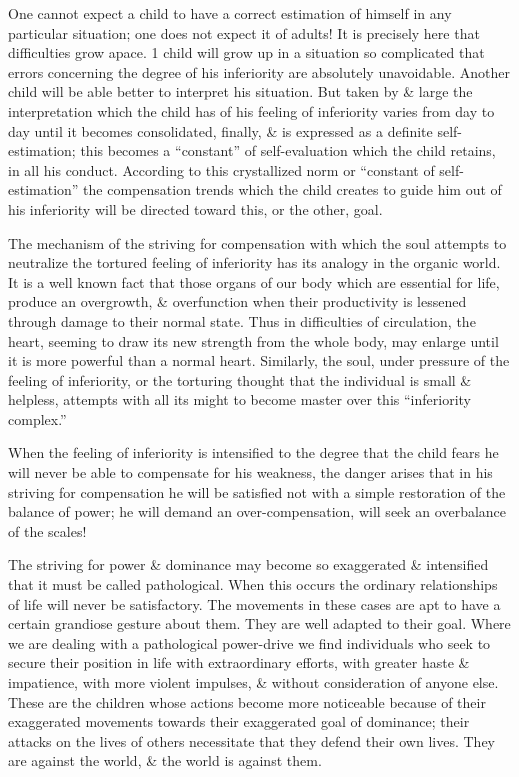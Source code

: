 \documentclass{article}
\begin{document}
One cannot expect a child to have a correct estimation of himself in any particular situation; one does not expect it of adults! It is precisely here that difficulties grow apace. 1 child will grow up in a situation so complicated that errors concerning the degree of his inferiority are absolutely unavoidable. Another child will be able better to interpret his situation. But taken by \& large the interpretation which the child has of his feeling of inferiority varies from day to day until it becomes consolidated, finally, \& is expressed as a definite self-estimation; this becomes a ``constant'' of self-evaluation which the child retains, in all his conduct. According to this crystallized norm or ``constant of self-estimation'' the compensation trends which the child creates to guide him out of his inferiority will be directed toward this, or the other, goal.

The mechanism of the striving for compensation with which the soul attempts to neutralize the tortured feeling of inferiority has its analogy in the organic world. It is a well known fact that those organs of our body which are essential for life, produce an overgrowth, \& overfunction when their productivity is lessened through damage to their normal state. Thus in difficulties of circulation, the heart, seeming to draw its new strength from the whole body, may enlarge until it is more powerful than a normal heart. Similarly, the soul, under pressure of the feeling of inferiority, or the torturing thought that the individual is small \& helpless, attempts with all its might to become master over this ``inferiority complex.''

When the feeling of inferiority is intensified to the degree that the child fears he will never be able to compensate for his weakness, the danger arises that in his striving for compensation he will be satisfied not with a simple restoration of the balance of power; he will demand an over-compensation, will seek an overbalance of the scales!

The striving for power \& dominance may become so exaggerated \& intensified that it must be called pathological. When this occurs the ordinary relationships of life will never be satisfactory. The movements in these cases are apt to have a certain grandiose gesture about them. They are well adapted to their goal. Where we are dealing with a pathological power-drive we find individuals who seek to secure their position in life with extraordinary efforts, with greater haste \& impatience, with more violent impulses, \& without consideration of anyone else. These are the children whose actions become more noticeable because of their exaggerated movements towards their exaggerated goal of dominance; their attacks on the lives of others necessitate that they defend their own lives. They are against the world, \& the world is against them.
\end{document}
